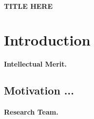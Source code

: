 \begin{center}
{\bf \Large TITLE HERE}
\end{center}

\section{Introduction}
\label{sec:intro}


\paragraph{Intellectual Merit.} 


\subsection{Motivation ...}
\label{sec:motivation}


\paragraph{Research Team.}   
